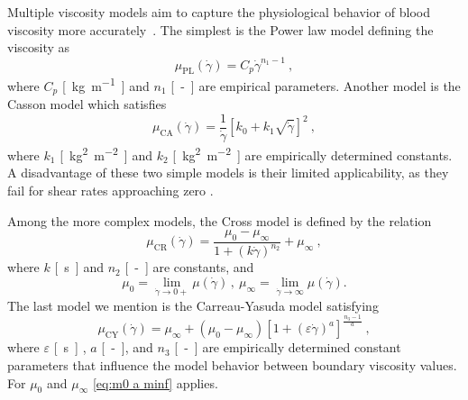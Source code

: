 Multiple viscosity models aim to capture the physiological behavior of blood viscosity more accurately~\cite{Saloner2019, Eichler2023, Boyd2007}. The simplest is the Power law model \cite{Sequeira} defining the viscosity as
\begin{equation}\label{eq:power-law}
	\mu _{\text{PL}} (\dot{\gamma}) = C_p  \dot{\gamma} ^{n_1-1} \ ,
\end{equation}
where $ C_p$ \si{[kg.m^{-1}]} and $ n_1 $ \si{[-]} are empirical parameters. Another model is the Casson model \cite{Boyd2007} which satisfies
\begin{equation}\label{eq:Casson}
	\mu _{\text{CA}} (\dot{\gamma}) = \frac{1}{\dot{\gamma}} \left[ k_{0} + k_{1} \sqrt{\dot{\gamma}} \right]^2 \ ,
\end{equation}
where $ k_1$ \si{[kg^{2}.m^{-2}]} and $ k_2 $ \si{[kg^{2}.m^{-2}]} are empirically determined constants. A disadvantage of these two simple models is their limited applicability, as they fail for shear rates approaching zero \cite{Boyd2007}.

Among the more complex models, the Cross model \cite{Sequeira} is defined by the relation
\begin{equation}\label{eq:cross}
	\mu _{\text{CR}} (\dot{\gamma}) = \frac{\mu_{0} - \mu_{\infty}}{1 + (k\dot{\gamma})^{n_2}} + \mu_{\infty}  \ ,
\end{equation}
where $ k $ \si{[s]} and $ n_2 $ \si{[-]} are constants, and
\begin{equation}\label{eq:m0 a minf}
	\mu _{0}  = \lim_{\dot{\gamma} \rightarrow 0+}\mu (\dot{\gamma})\, , \ \mu_{\infty} = \lim_{\dot{\gamma} \rightarrow \infty}\mu (\dot{\gamma}).
\end{equation}
The last model we mention is the Carreau-Yasuda model \cite{Boyd2007} satisfying
\begin{equation}\label{eq:C-Y}
	\mu _{\text{CY}} (\dot{\gamma}) = \mu_{\infty} + (\mu_{0} - \mu_{\infty}) \left[ 1 + (\varepsilon \dot{\gamma}) ^{a} \right]^{\frac{n_3-1}{a}} \ ,
\end{equation}
where $ \varepsilon$ \si{[s]} , $a$ \si{[-]}, and $ n_3 $ \si{[-]} are empirically determined constant parameters that influence the model behavior between boundary viscosity values. For $ \mu_{0}$ and $ \mu_{\infty} $ \eqref{eq:m0 a minf} applies.

